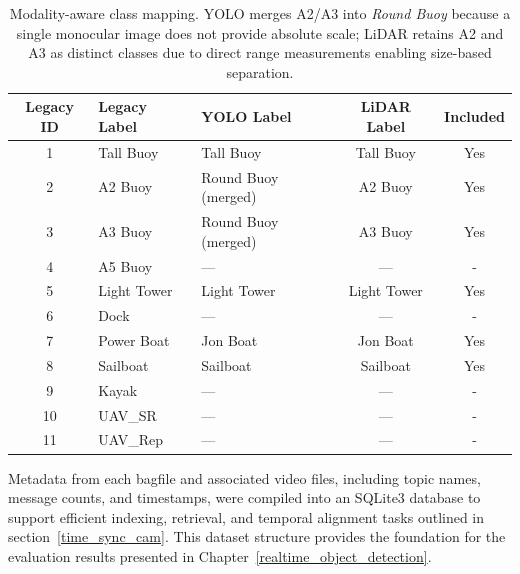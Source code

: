 \documentclass[../main.tex]{subfiles}
\begin{document}
\begin{table}[ht]
\centering
\begin{tabular}{cllcc}
\hline
Legacy ID & Legacy Label & YOLO Label & LiDAR Label  & Included \\
\hline
1  & Tall Buoy          & Tall Buoy              & Tall Buoy          & Yes \\
2  & A2 Buoy            & Round Buoy (merged)    & A2 Buoy            & Yes \\
3  & A3 Buoy            & Round Buoy (merged)    & A3 Buoy            & Yes \\
4  & A5  Buoy           & —                      & —                  & - \\
5  & Light Tower        & Light Tower            & Light Tower        & Yes \\
6  & Dock               & —                      & —                  & - \\
7  & Power Boat         & Jon Boat               & Jon Boat           & Yes \\
8  & Sailboat           & Sailboat               & Sailboat           & Yes \\
9  & Kayak              & —                      & —                  & - \\
10 & UAV\_SR    & —                      & —                  & - \\
11 & UAV\_Rep   & —                      & —                  & - \\
\hline
\end{tabular}
\caption{Modality-aware class mapping. YOLO merges A2/A3 into \emph{Round Buoy} because a single monocular image does not provide absolute scale; LiDAR retains A2 and A3 as distinct classes due to direct range measurements enabling size-based separation.}
\label{tab:class_map}
\end{table}

Metadata from each bagfile and associated video files, including topic names, message counts, and timestamps, were compiled into an SQLite3 database to support efficient indexing, retrieval, and temporal alignment tasks outlined in section~\ref{time_sync_cam}.
This dataset structure provides the foundation for the evaluation results presented in Chapter~\ref{realtime_object_detection}.

\end{document}
